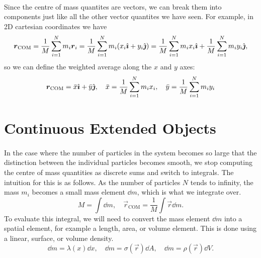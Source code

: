 \documentclass[../classical_mechanics.tex]{subfiles}
\begin{document}
        \paragraph{}
        Since the centre of mass quantites are vectors, we can break them into components just like all the other vector quantites we have seen.
        For example, in 2D cartesian coordinates we have
        \begin{equation}
            \boldsymbol{r}_\text{COM}=\frac{1}{M}\sum_{i=1}^N m_i\boldsymbol{r}_i=\frac{1}{M}\sum_{i=1}^N m_i(x_i\hat{\boldsymbol{\imath}}+y_i\hat{\boldsymbol{\jmath}})=\frac{1}{M}\sum_{i=1}^N m_ix_i\hat{\boldsymbol{\imath}}+\frac{1}{M}\sum_{i=1}^N m_iy_i\hat{\boldsymbol{\jmath}},
        \end{equation}
        so we can define the weighted average along the $x$ and $y$ axes:
        \begin{equation}
            \boldsymbol{r}_\text{COM}=\bar{x}\hat{\boldsymbol{\imath}}+\bar{y}\hat{\boldsymbol{\jmath}},\quad\bar{x}=\frac{1}{M}\sum_{i=1}^N m_ix_i,\quad\bar{y}=\frac{1}{M}\sum_{i=1}^N m_iy_i
        \end{equation}

    \section{Continuous Extended Objects}\label{sec:continuous-extended-objects}
        \paragraph{}
        In the case where the number of particles in the system becomes so large that the distinction between the individual particles becomes smooth, we stop computing the centre of mass quantities as discrete sums and switch to integrals.
        The intuition for this is as follows.
        As the number of particles $N$ tends to infinity, the mass $m_i$ becomes a small mass element $\dd{m}$, which is what we integrate over.
        \begin{equation}
            M=\int\dd{m},\quad\vec{r}_\text{COM}=\frac{1}{M}\int\vec{r}\dd{m}.
        \end{equation}
        To evaluate this integral, we will need to convert the mass element $\dd{m}$ into a spatial element, for example a length, area, or volume element.
        This is done using a linear, surface, or volume density.
        \begin{equation}
            \dd{m}=\lambda(x)\dd{x},\quad\dd{m}=\sigma(\vec{r})\dd{A},\quad\dd{m}=\rho(\vec{r})\dd{V}.
        \end{equation}
\end{document}
